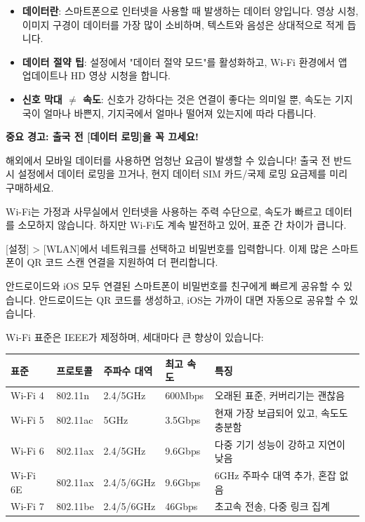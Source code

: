 
\begin{itemize}
  \item \textbf{데이터란}: 스마트폰으로 인터넷을 사용할 때 발생하는 데이터 양입니다. 영상 시청, 이미지 구경이 데이터를 가장 많이 소비하며, 텍스트와 음성은 상대적으로 적게 듭니다.
  \item \textbf{데이터 절약 팁}: 설정에서 "데이터 절약 모드"를 활성화하고, Wi-Fi 환경에서 앱 업데이트나 HD 영상 시청을 합니다.
  \item \textbf{신호 막대 $\neq$ 속도}: 신호가 강하다는 것은 연결이 좋다는 의미일 뿐, 속도는 기지국이 얼마나 바쁜지, 기지국에서 얼마나 떨어져 있는지에 따라 다릅니다.
\end{itemize}

\textbf{중요 경고: 출국 전 [데이터 로밍]을 꼭 끄세요!}\par

해외에서 모바일 데이터를 사용하면 엄청난 요금이 발생할 수 있습니다! 출국 전 반드시 설정에서 데이터 로밍을 끄거나, 현지 데이터 SIM 카드/국제 로밍 요금제를 미리 구매하세요.


Wi-Fi는 가정과 사무실에서 인터넷을 사용하는 주력 수단으로, 속도가 빠르고 데이터를 소모하지 않습니다. 하지만 Wi-Fi도 계속 발전하고 있어, 표준 간 차이가 큽니다.


[설정] > [WLAN]에서 네트워크를 선택하고 비밀번호를 입력합니다. 이제 많은 스마트폰이 QR 코드 스캔 연결을 지원하여 더 편리합니다.


안드로이드와 iOS 모두 연결된 스마트폰이 비밀번호를 친구에게 빠르게 공유할 수 있습니다. 안드로이드는 QR 코드를 생성하고, iOS는 가까이 대면 자동으로 공유할 수 있습니다.


Wi-Fi 표준은 IEEE가 제정하며, 세대마다 큰 향상이 있습니다:

\begin{center}
\begin{tabularx}{\linewidth}{|X|X|X|X|X|}
\hline
\textbf{표준} & \textbf{프로토콜} & \textbf{주파수 대역} & \textbf{최고 속도} & \textbf{특징} \tabularnewline
\hline
Wi-Fi 4 & 802.11n & 2.4/5GHz & 600Mbps & 오래된 표준, 커버리기는 괜찮음 \tabularnewline
Wi-Fi 5 & 802.11ac & 5GHz & 3.5Gbps & 현재 가장 보급되어 있고, 속도도 충분함 \tabularnewline
Wi-Fi 6 & 802.11ax & 2.4/5GHz & 9.6Gbps & 다중 기기 성능이 강하고 지연이 낮음 \tabularnewline
Wi-Fi 6E & 802.11ax & 2.4/5/6GHz & 9.6Gbps & 6GHz 주파수 대역 추가, 혼잡 없음 \tabularnewline
Wi-Fi 7 & 802.11be & 2.4/5/6GHz & 46Gbps & 초고속 전송, 다중 링크 집계 \tabularnewline
\hline
\end{tabularx}
\end{center}


